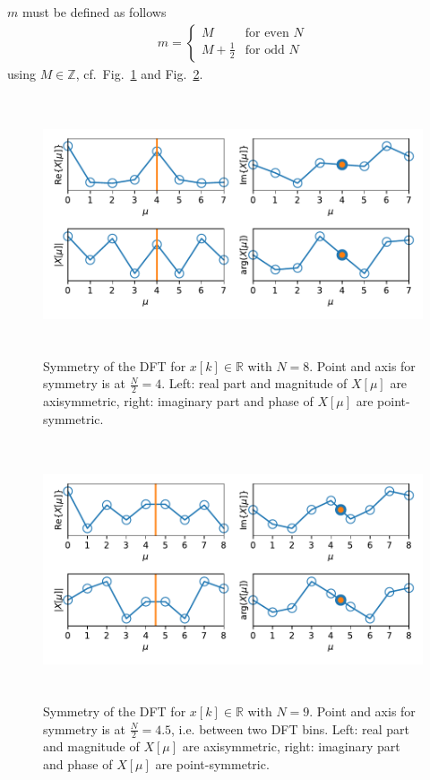 \documentclass[11pt,a4paper,DIV=12]{scrartcl}
\begin{document}
$m$ must be defined as follows
\begin{align}
m=\begin{cases}M&\text{for even }N\\
M+\frac{1}{2}&\text{for odd }N\end{cases}
\end{align}
%
using $M\in\mathbb{Z}$, cf.~Fig.~\ref{Symmetry_DFT_N8} and Fig.~\ref{Symmetry_DFT_N9}.
%
\begin{figure}
		\centering
		\includegraphics[width=6in, height=3in]{graphics/Symmetry_DFT_N8.pdf}
		\caption{Symmetry of the DFT for $x[k]\in\mathbb{R}$ with $N=8$.
		Point and axis for symmetry is at $\frac{N}{2}=4$.
		Left: real part and magnitude of $X[\mu]$ are axisymmetric,
		right: imaginary part and phase of $X[\mu]$ are point-symmetric.}
		\label{Symmetry_DFT_N8}
\end{figure}
\begin{figure}
		\centering
		\includegraphics[width=6in, height=3in]{graphics/Symmetry_DFT_N9.pdf}
		\caption{Symmetry of the DFT for $x[k]\in\mathbb{R}$ with $N=9$.
		Point and axis for symmetry is at $\frac{N}{2}=4.5$, i.e. between two DFT bins.
		Left: real part and magnitude of $X[\mu]$ are axisymmetric,
		right: imaginary part and phase of $X[\mu]$ are point-symmetric.}
		\label{Symmetry_DFT_N9}
\end{figure}
\end{document}
